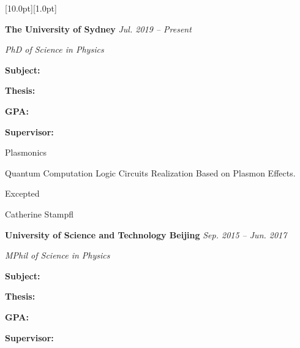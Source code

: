 \documentclass[12pt,a4paper,utf8]{report}
\begin{document}
\begin{minipage}[t]{16cm}
    \colorbox{subtitlecolor}{\raisebox{0pt}[10.0pt][1.0pt]{
        \textcolor{white}{\textsf{}}}}
\end{minipage}\par
\vspace{0.2cm}\hspace{0.5cm}
\begin{minipage}[t]{15.0cm}
    {{\textbf{The University of Sydney}}}\hfill
    {\em{Jul. 2019 -- Present}}\par\vspace{0.1cm}
    {\qquad\em{PhD of Science in Physics}}\par
\end{minipage}\par
\vspace{0.1cm}
    \begin{minipage}[t]{4cm}
        \qquad \textbf{Subject:}\par
        \qquad \textbf{Thesis:}\par
        \qquad \par
        \qquad \textbf{GPA:}\par
        \qquad \textbf{Supervisor:}\par
    \end{minipage}
    \begin{minipage}[t]{11cm}
        Plasmonics\par
        Quantum Computation Logic Circuits Realization Based on Plasmon Effects.\par
        Excepted\par
        Catherine Stampfl\par
    \end{minipage}\par
\vspace{0.2cm}\hspace{0.5cm}
\begin{minipage}[t]{15.0cm}
    {{\textbf{University of Science and Technology Beijing}}}\hfill
    {\em{Sep. 2015 -- Jun. 2017}}\par\vspace{0.1cm}
    {\qquad\em{MPhil of Science in Physics}}\par
\end{minipage}\par
\vspace{0.1cm}
    \begin{minipage}[t]{4cm}
        \qquad \textbf{Subject:}\par
        \qquad \textbf{Thesis:}\par
        \qquad \par
        \qquad \textbf{GPA:}\par
        \qquad \textbf{Supervisor:}\par
    \end{minipage}
\end{document}
